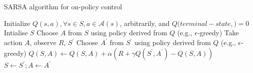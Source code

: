 \bgroup
\begin{frame}{SARSA algorithm for on-policy control}
\begin{algorithmic}
\STATE Initialize $Q(s,a), \forall s \in S, a \in \mathcal{A}(s)$, arbitrarily, and $Q(terminal-state, \dot)=0$
\STATE Intialise $S$
\STATE Choose $A$ from $S$ using policy derived from $Q$ (e.g., $\epsilon$-greedy)
\STATE Take action $A$, observe $R$, $S^{\prime}$
\STATE Choose $A^{\prime}$ from $S^{\prime}$ using policy derived from $Q$ (e.g., $\epsilon$-greedy)
\STATE $Q(S,A) \leftarrow Q(S,A) + \alpha (R + \gamma Q(S^{\prime}, A^{\prime}) - Q(S,A))$
\STATE $S \leftarrow S^{\prime}; A \leftarrow A^{\prime}$
\ENDFOR
\ENDFOR
\end{algorithmic}
\end{frame}
\egroup